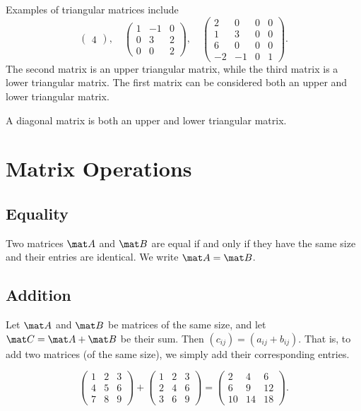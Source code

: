 \begin{example}
    Examples of triangular matrices include \[\begin{pmatrix}4\end{pmatrix}, \quad \begin{pmatrix}1 & -1 & 0 \\ 0 & 3 & 2 \\ 0 & 0 & 2\end{pmatrix}, \quad \begin{pmatrix}2 & 0 & 0 & 0 \\ 1 & 3 & 0 & 0 \\ 6 & 0 & 0 & 0 \\ -2 & -1 & 0 & 1\end{pmatrix}.\] The second matrix is an upper triangular matrix, while the third matrix is a lower triangular matrix. The first matrix can be considered both an upper and lower triangular matrix.
\end{example}

A diagonal matrix is both an upper and lower triangular matrix.

\section{Matrix Operations}

\subsection{Equality}

\begin{definition}
    Two matrices $\mat A$ and $\mat B$ are equal if and only if they have the same size and their entries are identical. We write $\mat A = \mat B$.
\end{definition}

\subsection{Addition}

\begin{definition}
    Let $\mat A$ and $\mat B$ be matrices of the same size, and let $\mat C = \mat A + \mat B$ be their sum. Then $(c_{ij}) = (a_{ij} + b_{ij})$. That is, to add two matrices (of the same size), we simply add their corresponding entries.
\end{definition}

\begin{example}
    \[\begin{pmatrix}1 & 2 & 3 \\ 4 & 5 & 6 \\ 7 & 8 & 9\end{pmatrix} + \begin{pmatrix}1 & 2 & 3 \\ 2 & 4 & 6 \\ 3 & 6 & 9\end{pmatrix} = \begin{pmatrix}2 & 4 & 6 \\ 6 & 9 & 12 \\ 10 & 14 & 18\end{pmatrix}.\]
\end{example}


